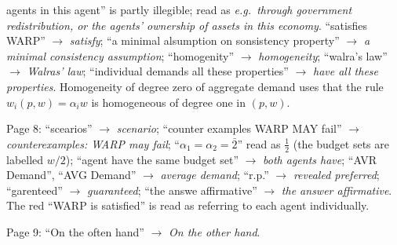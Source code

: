 \documentclass[11pt]{article}
\begin{document}
\begin{transcriptnotes}
        agents in this agent'' is partly illegible; read as \emph{e.g.\ through
        government redistribution, or the agents' ownership of assets in this
        economy}. ``satisfies WARP'' $\to$ \emph{satisfy}; ``a minimal
        alsumption on sonsistency property'' $\to$ \emph{a minimal consistency
        assumption}; ``homogenity'' $\to$ \emph{homogeneity}; ``walra's law''
        $\to$ \emph{Walras' law}; ``individual demands all these properties''
        $\to$ \emph{have all these properties}. Homogeneity of degree zero of
        aggregate demand uses that the rule $w_i(p,w)=\alpha_i w$ is homogeneous
        of degree one in $(p,w)$.
  \item Page 8: ``scearios'' $\to$ \emph{scenario}; ``counter examples WARP
        MAY fail'' $\to$ \emph{counterexamples: WARP may fail};
        ``$\alpha_1=\alpha_2=\bar{2}$'' read as $\tfrac12$ (the budget sets are
        labelled $w/2$); ``agent have the same budget set'' $\to$ \emph{both
        agents have}; ``AVR Demand'', ``AVG Demand'' $\to$ \emph{average
        demand}; ``r.p.'' $\to$ \emph{revealed preferred}; ``garenteed'' $\to$
        \emph{guaranteed}; ``the answe affirmative'' $\to$ \emph{the answer
        affirmative}. The red ``WARP is satisfied'' is read as referring to each
        agent individually.
  \item Page 9: ``On the often hand'' $\to$ \emph{On the other hand}.
\end{transcriptnotes}
\end{document}
